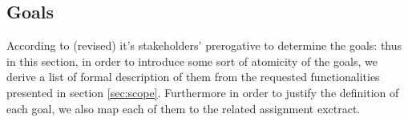 \subsection{Goals}
According to \cite{jackson_dsfr} (revised) it's stakeholders' prerogative to determine the goals: thus in this section, in order to introduce some sort of atomicity of the goals, we derive a list of formal description of them from the requested functionalities presented in section \ref{sec:scope}. Furthermore in order to justify the definition of each goal, we also map each of them to the related assignment exctract.
\newline\newline
{}
\newline\newline
{}
\newline\newline
{}

